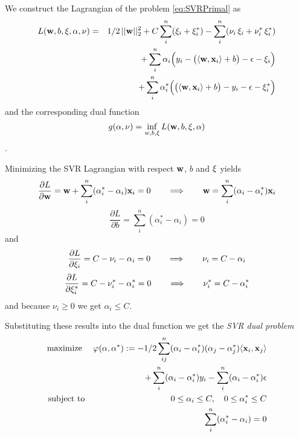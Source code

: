 We construct the Lagrangian of the problem \eqref{eq:SVRPrimal} as
\begin{eqnarray}\label{eq:SVRLagrangian}\index{SVR Lagrangian}
  L(\vc{w},b,\vc{\xi},\vc{\alpha},\vc{\nu}) & = & 1/2 \, ||\vc{w}||_2^2 + C \sum_i^n (\xi_i+ \xi^*_i) - \sum_i^n (\nu_i \, \xi_i + \nu^*_i \, \xi^*_i ) \nonumber \\
& & + \sum_i^n \alpha_i \Big( y_i - \big( \langle \vc{w},\vc{x}_i \rangle + b \big) - \epsilon - \xi_i\Big)  \nonumber \\
& & + \sum_i^n \alpha^*_i \Big( \big( \langle \vc{w},\vc{x}_i \rangle + b \big) -y_i - \epsilon - \xi^*_i\Big)
\end{eqnarray}
and the corresponding dual function
\begin{equation}\label{eq:SVRDualFce}\index{SVR dual function}
    g(\vc{\alpha},\vc{\nu}) =  \inf_{w,b,\xi} L(\vc{w},b,\vc{\xi},\vc{\alpha})
\end{equation}. 

Minimizing the SVR Lagrangian with respect $\mathbf{w}$, $b$ and $\mathbf{\xi}$ yields
\begin{equation}
 \frac{\partial{L}}{\partial{\mathbf{w}}} = \mathbf{w} + \sum_i^n (\alpha^*_i - \alpha_i) \mathbf{x}_i = 0 \qquad \Longrightarrow \qquad \mathbf{w} = \sum_i^n (\alpha_i - \alpha^*_i) \mathbf{x}_i
\end{equation}
\begin{equation}
 \frac{\partial{L}}{\partial{b}} = \sum_i^n (\alpha^*_i - \alpha_i) = 0
\end{equation}
and
\begin{equation}
 \frac{\partial{L}}{\partial{\mathbf{\xi}_i}} = C-\nu_i- \alpha_i = 0 
 \qquad \Longrightarrow \qquad \nu_i = C -\alpha_i
\end{equation}
\begin{equation}
 \frac{\partial{L}}{\partial{\mathbf{\xi}^*_i}} = C-\nu^*_i- \alpha^*_i = 0 
 \qquad \Longrightarrow \qquad \nu^*_i = C -\alpha^*_i
\end{equation}
and because $\nu_i \geq 0$ we get $\alpha_i \leq C$.

Substituting these results into the dual function we get the \emph{SVR dual problem} 
\begin{eqnarray}\label{eq:SVRDual}\index{Soft-margin SVM dual problem}
  \text{maximize }  & & \varphi(\vc{\alpha},\vc{\alpha}^*) :=  - 1/2 \sum_{ij}^n (\alpha_i - \alpha^*_i)(\alpha_j - \alpha^*_j) \langle \vc{x}_i, \vc{x}_j \rangle
\nonumber \\
& & \qquad + \sum_i^n (\alpha_i - \alpha^*_i) y_i 
- \sum_i^n (\alpha_i - \alpha^*_i) \epsilon \nonumber \\
  \text{subject to} & & 0 \leq \alpha_i \leq C, \quad 0 \leq \alpha^*_i \leq C \nonumber \\
   & & \sum_i^n (\alpha^*_i - \alpha_i) = 0
\end{eqnarray}

